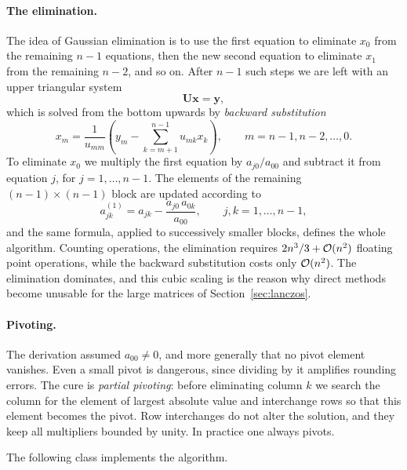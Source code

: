 \paragraph{The elimination.}
The idea of Gaussian elimination is to use the first equation to eliminate
$x_0$ from the remaining $n-1$ equations, then the new second equation to
eliminate $x_1$ from the remaining $n-2$, and so on.  After $n-1$ such steps
we are left with an upper triangular system
\begin{equation}
  \bm{U}\bm{x} = \bm{y},
  \label{eq:1-uppertri}
\end{equation}
which is solved from the bottom upwards by \emph{backward substitution}
\begin{equation}
  x_m = \frac{1}{u_{mm}}
        \left(y_m - \sum_{k=m+1}^{n-1} u_{mk}x_k\right),
  \qquad m=n-1,n-2,\dots,0 .
  \label{eq:1-backsub}
\end{equation}
To eliminate $x_0$ we multiply the first equation by $a_{j0}/a_{00}$ and
subtract it from equation $j$, for $j=1,\dots,n-1$.  The elements of the
remaining $(n-1)\times(n-1)$ block are updated according to
\begin{equation}
  a^{(1)}_{jk} = a_{jk} - \frac{a_{j0}\,a_{0k}}{a_{00}},
  \qquad j,k = 1,\dots,n-1 ,
  \label{eq:1-gausstep}
\end{equation}
and the same formula, applied to successively smaller blocks, defines the
whole algorithm.  Counting operations, the elimination requires
$2n^3/3+\mathcal{O}(n^2)$ floating point operations, while the backward
substitution costs only $\mathcal{O}(n^2)$.  The elimination dominates, and this
cubic scaling is the reason why direct methods become unusable for the large
matrices of Section~\ref{sec:lanczos}.

\paragraph{Pivoting.}
The derivation assumed $a_{00}\ne0$, and more generally that no pivot element
vanishes.  Even a small pivot is dangerous, since dividing by it amplifies
rounding errors.  The cure is \emph{partial pivoting}: before eliminating
column $k$ we search the column for the element of largest absolute value and
interchange rows so that this element becomes the pivot.  Row interchanges do
not alter the solution, and they keep all multipliers bounded by unity.  In
practice one always pivots.

The following class implements the algorithm.

